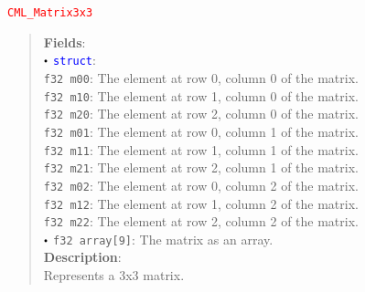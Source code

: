 \documentclass[a4paper,oneside,8pt]{extarticle}
\newcommand{\union}[1]{
  \noindent\textcolor{red}{\texttt{#1}}
  \vspace{-0.3em}
}
\renewcommand{\dot}{\raisebox{0.3ex}{\scalebox{0.6}{$\bullet$}}}
\theoremstyle{definition}
\begin{document}
\union{CML\_Matrix3x3}
\begin{quote}
  \textbf{Fields}: \\
  $\dot$ \textcolor{blue}{\texttt{struct}}: \\
  \indent\hspace{1em} \texttt{f32 m00}: The element at row 0, column 0 of the matrix. \\
  \indent\hspace{1em} \texttt{f32 m10}: The element at row 1, column 0 of the matrix. \\
  \indent\hspace{1em} \texttt{f32 m20}: The element at row 2, column 0 of the matrix. \\
  \indent\hspace{1em} \texttt{f32 m01}: The element at row 0, column 1 of the matrix. \\
  \indent\hspace{1em} \texttt{f32 m11}: The element at row 1, column 1 of the matrix. \\
  \indent\hspace{1em} \texttt{f32 m21}: The element at row 2, column 1 of the matrix. \\
  \indent\hspace{1em} \texttt{f32 m02}: The element at row 0, column 2 of the matrix. \\
  \indent\hspace{1em} \texttt{f32 m12}: The element at row 1, column 2 of the matrix. \\
  \indent\hspace{1em} \texttt{f32 m22}: The element at row 2, column 2 of the matrix. \\
  $\dot$ \texttt{f32 array[9]}: The matrix as an array. \\

  \vspace{-0.75em}
  \textbf{Description}: \\
  Represents a 3x3 matrix. \\
\end{quote}
\end{document}
